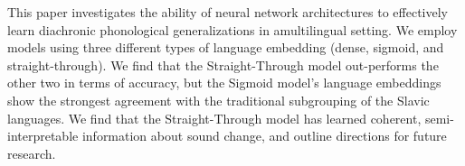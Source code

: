 This paper  investigates  the  ability  of  neural  network  architectures  to  effectively  learn diachronic  phonological  generalizations  in  amultilingual  setting.   We  employ  models  using three  different types  of language embedding  (dense,  sigmoid,  and  straight-through). We find that the Straight-Through model out-performs the other two in terms of accuracy, but the Sigmoid model's language embeddings show the strongest agreement with the traditional  subgrouping  of  the  Slavic  languages. We find that the Straight-Through model has learned coherent,  semi-interpretable information  about  sound  change,  and  outline  directions for future research.
